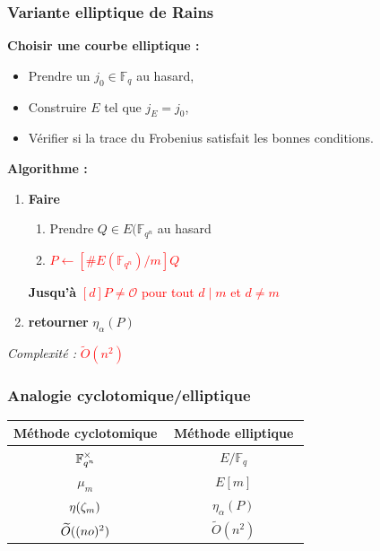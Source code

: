\documentclass{beamer} %
\numberwithin{equation}{section}
\newcommand\GF[1]{\mathbb{F}_{#1}}
\newcommand\EO{\mathcal{O}}
\newcommand\tO[1]{\widetilde{O}(#1)}
\begin{document}
\begin{frame}
\frametitle{Variante elliptique de Rains}
\textbf{Choisir une courbe elliptique :}\\
\begin{itemize}
	\item Prendre un $j_0\in\GF{q}$ au hasard,
	\item Construire $E$ tel que $j_E = j_0$,
	\item Vérifier si la trace du Frobenius satisfait les bonnes conditions.
\end{itemize}
\vspace{0.3cm}
\textbf{Algorithme :} 
\begin{enumerate}
	\item \textbf{Faire}
	\begin{enumerate}
		\item Prendre $Q\in E(\GF{q^n}$ au hasard
		\item \textcolor{red}{$P \leftarrow [\#E(\GF{q^n})/m]Q$}
	\end{enumerate}
	\textbf{Jusqu'à} \textcolor{red}{$[d]P \neq \EO$ pour tout $d\mid m$ et 
				$d\neq m$}
	\item \textbf{retourner} $\eta_{\alpha}(P)$
\end{enumerate}
\vspace{0.3cm}
\emph{Complexité :} \textcolor{red}{$\tO{n^2}$}
	


\end{frame}
\begin{frame}
\frametitle{Analogie cyclotomique/elliptique}
\begin{table}
\begin{tabular}{|c|c|}
\hline
Méthode cyclotomique & $\,$$\,$Méthode elliptique$\,$$\,$\\
\hline
\hline
$\rule{0pt}{2.7ex}\GF{q^n}^{\times}$ & $E/\GF{q}$\\
\hline
\rule{0pt}{2.7ex}$\mu_m$ & $E[m]$\\
\hline
$\rule{0pt}{2.7ex}\eta(\zeta_m)$ & $\eta_{\alpha}(P)$\\
\hline
$\rule{0pt}{2.7ex}\tO{(no)^2}$ & $\tO{n^2}$\\
\hline
\end{tabular}
\end{table}
\end{frame}
\end{document}
